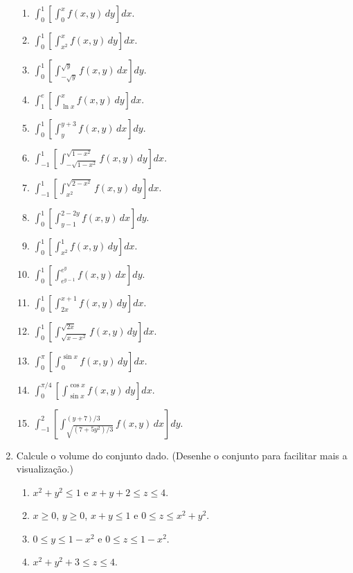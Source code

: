 \documentclass[11pt,a4paper]{article}
\newcommand{\integral}{\displaystyle\int}
\begin{document}
\begin{enumerate}
		\begin{enumerate}
			\item $\integral_0^{1} \left[ \integral_0^{x} f(x,y) \, dy \right] dx$.
			\item $\integral_0^{1} \left[ \integral_{x^2}^{x} f(x,y) \, dy \right] dx$.
			\item $\integral_0^{1} \left[ \integral_{-\sqrt{y}}^{\sqrt{y}} f(x,y) \, dx \right] dy$.
			\item $\integral_1^{e} \left[ \integral_{\ln x}^{x} f(x,y) \, dy \right] dx$.
			\item $\integral_0^{1} \left[ \integral_y^{y+3} f(x,y) \, dx \right] dy$.
			\item $\integral_{-1}^{1} \left[ \integral_{-\sqrt{1-x^2}}^{\sqrt{1-x^2}} f(x,y) \, dy \right] dx$.
			\item $\integral_{-1}^{1} \left[ \integral_{x^2}^{\sqrt{2-x^2}} f(x,y) \, dy \right] dx$.
			\item $\integral_0^{1} \left[ \integral_{y-1}^{2-2y} f(x,y) \, dx \right] dy$.
			\item $\integral_0^{1} \left[ \integral_{x^2}^{1} f(x,y) \, dy \right] dx$.
			\item $\integral_0^{1} \left[ \integral_{e^{y-1}}^{e^y} f(x,y) \, dx \right] dy$.
			\item $\integral_0^{1} \left[ \integral_{2x}^{x+1} f(x,y) \, dy \right] dx$.
			\item $\integral_0^{1} \left[ \integral_{\sqrt{x-x^2}}^{\sqrt{2x}} f(x,y) \, dy \right] dx$.
			\item $\integral_0^{\pi} \left[ \integral_0^{\sin x} f(x,y) \, dy \right] dx$.
			\item $\integral_0^{\pi/4} \left[ \integral_{\sin x}^{\cos x} f(x,y) \, dy \right] dx$.
			\item $\integral_{-1}^{2} \left[ \integral_{\sqrt{(7+5y^2)/3}}^{(y+7)/3} f(x,y) \, dx \right] dy$.
			
		\end{enumerate}
		
		\item Calcule o volume do conjunto dado. (Desenhe o conjunto para facilitar mais a visualização.)
		
		\begin{enumerate}
			\item $x^2 + y^2 \leq 1$ e $x+y+2 \leq z \leq 4$.
			\item $x \geq 0$, $y \geq 0$, $x+y \leq 1$ e $0 \leq z \leq x^2 + y^2$.
			\item $0 \leq y \leq 1 - x^2$ e $0 \leq z \leq 1-x^2$.
			\item $x^2 + y^2 + 3 \leq z \leq 4$.
			

\end{enumerate}
\end{enumerate}
\end{document}
